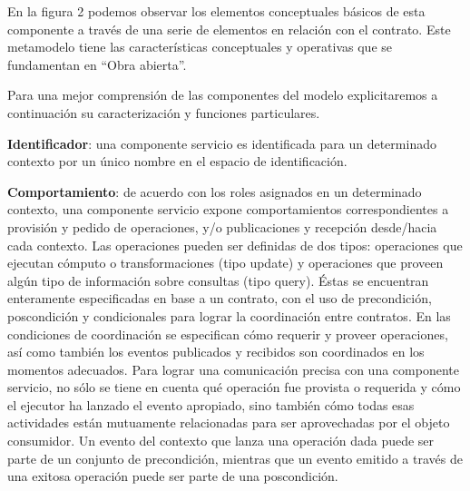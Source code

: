 En la figura 2 podemos observar los elementos conceptuales básicos de esta
componente a través de una serie de elementos en relación con el contrato.
Este metamodelo tiene las características conceptuales y operativas que se
fundamentan en “Obra abierta”.

Para una mejor comprensión de las componentes del modelo explicitaremos
a continuación su caracterización y funciones particulares.

\textbf{Identificador}: una componente servicio es identificada para un
determinado
contexto por un único nombre en el espacio de identificación.

\textbf{Comportamiento}: de acuerdo con los roles asignados en un determinado
contexto, una componente servicio expone comportamientos correspondientes a
provisión y pedido de operaciones, y/o publicaciones y recepción desde/hacia
cada contexto. Las operaciones pueden ser definidas de dos tipos: operaciones
que ejecutan cómputo o transformaciones (tipo update) y operaciones que proveen
algún tipo de información sobre consultas (tipo query). Éstas se encuentran
enteramente especificadas en base a un contrato, con el uso de precondición,
poscondición y condicionales para lograr la coordinación entre contratos. En las
condiciones de coordinación se especifican cómo requerir y proveer operaciones,
así como también los eventos publicados y recibidos son coordinados en los
momentos adecuados. Para lograr una comunicación precisa con una componente
servicio, no sólo se tiene en cuenta qué operación fue provista o requerida
y cómo el ejecutor ha lanzado el evento apropiado, sino también cómo todas
esas actividades están mutuamente relacionadas para ser aprovechadas por el
objeto consumidor. Un evento del contexto que lanza una operación dada
puede ser parte de un conjunto de precondición, mientras que un evento emitido
a través de una exitosa operación puede ser parte de una poscondición.


